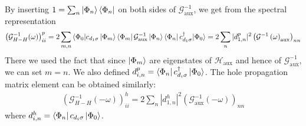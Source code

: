 \documentclass{report}
\numberwithin{equation}{section}
\begin{document}
By inserting \(1 = \sum_n \ket{\Phi_n}\bra{\Phi_n}\) on both sides of \(\mathcal{G}^{-1}_\text{aux}\), we get from the spectral representation
\begin{equation}\begin{aligned}
	\left(\mathcal{G}^{-1}_{H-H}(\omega)\right)^p_{ii} = 2\sum_{m,n} \braket{\Phi_0 | c_{d_1\sigma} \ket{\Phi_m}\bra{\Phi_m}\mathcal{G}^{-1}_\text{aux} \ket{\Phi_n}\bra{\Phi_n} c^\dagger_{d_1\sigma} | \Phi_0} = 2\sum_{n} |d^p_{1,n}|^2 \left(\mathcal{G}^{-1}\left(\omega\right) _\text{aux}\right)_{nn}
\end{aligned}\end{equation}
There we used the fact that since \(\ket{\Phi_m}\) are eigenstates of \(\mathcal{H}_\text{aux}\) and hence of \(\mathcal{G}^{-1}_\text{aux}\), we can set \(m=n\). We also defined \(d^p_{i,n} = \bra{\Phi_n}c^\dagger_{d_i\sigma}\ket{\Phi_0}\). The hole propagation matrix element can be obtained similarly:
\begin{equation}\begin{aligned}
	\left(\mathcal{G}^{-1}_{H-H}(-\omega)\right)^h_{ii} = 2\sum_{n} |d^h_{1,n}|^2 \left(\mathcal{G}^{-1}_\text{aux}(-\omega)\right)_{nn} 
\end{aligned}\end{equation}
where \(d^h_{i,n} = \bra{\Phi_n}c_{d_i\sigma}\ket{\Phi_0}\).
\end{document}
